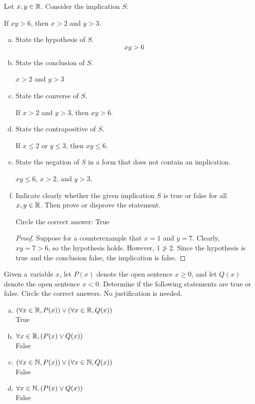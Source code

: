 \question Let $x,y\in\mathbb{R}$. Consider the implication $S$:
\begin{center}
  If $xy > 6$, then $x > 2$ and $y > 3$.
\end{center}
\begin{enumerate}[(a)]
  \item State the hypothesis of $S$. \[ xy > 6 \]
  \item State the conclusion of $S$. \begin{center}
          $x>2$ and $y>3$
        \end{center}
  \item State the converse of $S$. \begin{center}
          If $x>2$ and $y>3$, then $xy>6$.
        \end{center}
  \item State the contrapositive of $S$. \begin{center}
          If $x \leq 2$ or $y \leq 3$, then $xy \leq 6$.
        \end{center}
  \item State the negation of $S$ in a form that does not contain an implication. \begin{center}
          $xy \leq 6$, $x > 2$, and $y > 3$.
        \end{center}
  \item Indicate clearly whether the given implication $S$ is true or false for all $x,y\in\mathbb{R}$.
        Then prove or disprove the statement.

        Circle the correct answer: \quad True \quad {}
        \begin{proof}
          Suppose for a counterexample that $x=1$ and $y=7$.
          Clearly, $xy=7>6$, so the hypothesis holds.
          However, $1 \not> 2$.
          Since the hypothesis is true and the conclusion false, the implication is false.
        \end{proof}
\end{enumerate}


\question Given a variable $x$, let $P(x)$ denote the open sentence $x \geq 0$,
and let $Q(x)$ denote the open sentence $x < 0$.
Determine if the following statements are true or false.
Circle the correct answers. No justification is needed.
\begin{enumerate}[(a)]
  \item $(\forall x\in\mathbb{R},P(x))\lor(\forall x\in\mathbb{R},Q(x))$ \\ True \quad {}
  \item $\forall x\in\mathbb{R},(P(x) \lor Q(x))$ \\  \quad False
  \item $(\forall x\in\mathbb{N},P(x))\lor(\forall x\in\mathbb{N},Q(x))$ \\  \quad False
  \item $\forall x\in\mathbb{N}, (P(x) \lor Q(x))$ \\  \quad False
\end{enumerate}


